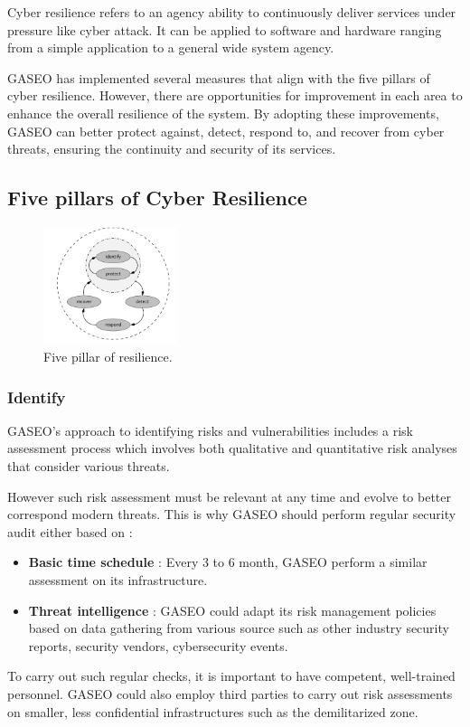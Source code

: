 \documentclass[12pt]{article}
\begin{document}
Cyber resilience refers to an agency ability to continuously deliver services under pressure like cyber attack. It can be applied to software and hardware ranging from a simple application to a general wide system agency.

GASEO has implemented several measures that align with the five pillars of cyber resilience. However, there are opportunities for improvement in each area to enhance the overall resilience of the system. By adopting these improvements, GASEO can better protect against, detect, respond to, and recover from cyber threats, ensuring the continuity and security of its services.

\subsection{Five pillars of Cyber Resilience}
\begin{figure}[h]
    \centering
    \includegraphics[width=0.35\textwidth]{Figures/Resilience/resilience-five_pillar.png}
    \caption{Five pillar of resilience.}
\end{figure}

\subsubsection*{Identify}
GASEO's approach to identifying risks and vulnerabilities includes a risk assessment process which involves both qualitative and quantitative risk analyses that consider various threats. 

However such risk assessment must be relevant at any time and evolve to better correspond modern threats. This is why GASEO should perform regular security audit either based on :
\begin{itemize}
    \item \textbf{Basic time schedule} : Every 3 to 6 month, GASEO perform a similar assessment on its infrastructure.
    \item \textbf{Threat intelligence} : GASEO could adapt its risk management policies based on data gathering from various source such as other industry security reports, security vendors, cybersecurity events.
\end{itemize}
To carry out such regular checks, it is important to have competent, well-trained personnel. GASEO could also employ third parties to carry out risk assessments on smaller, less confidential infrastructures such as the demilitarized zone.
\end{document}
